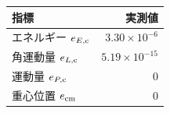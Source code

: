 \begin{tabular}{lr}\toprule
指標 & 実測値 \\
\midrule
エネルギー $e_{E,{\rm c}}$ & $3.30\times 10^{-6}$ \\
角運動量 $e_{L,{\rm c}}$ & $5.19\times 10^{-15}$ \\
運動量 $e_{P,{\rm c}}$ & $0$ \\
重心位置 $e_{\rm cm}$ & $0$ \\
\bottomrule\end{tabular}
